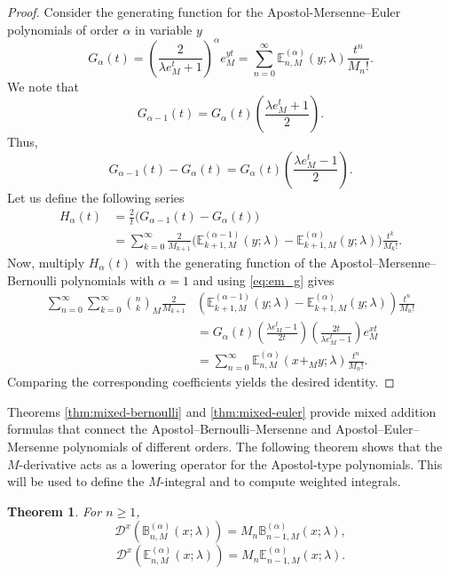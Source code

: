\documentclass[12pt, a4paper]{article}
\newtheorem{theorem}{Theorem}[section]
\theoremstyle{definition}
\numberwithin{equation}{section}
\newcommand{\B}{\mathbb{B}}
\newcommand{\E}{\mathbb{E}}
\begin{document}
\begin{proof}
Consider the generating function for the Apostol-Mersenne–Euler polynomials of order $\alpha$ in variable $y$
\[
G_\alpha(t) = \left(\frac{2}{\lambda e_M^t+1}\right)^\alpha e_M^{yt}
= \sum_{n=0}^\infty \E_{n,M}^{(\alpha)}(y;\lambda) \frac{t^n}{M_n!}. 
\]
We note that
\[
G_{\alpha-1}(t) = G_{\alpha}(t)\left(\frac{\lambda e_M^{t}+1}{2}\right).
\]
Thus,
\begin{equation}\label{eq:em_g}
G_{\alpha-1}(t)-G_{\alpha}(t) = G_{\alpha}(t)\left(\frac{\lambda e_M^{t}-1}{2}\right).
\end{equation}
Let us define the following series
\begin{align*}
H_{\alpha}(t) &= \frac{2}{t}\bigl( G_{\alpha-1}(t) - G_\alpha(t) \bigr)\\
&= \sum_{k=0}^\infty \frac{2}{M_{k+1}}\bigl( \E_{k+1,M}^{(\alpha-1)}(y;\lambda) - \E_{k+1,M}^{(\alpha)}(y;\lambda) \bigr) \frac{t^k}{M_k!}.
\end{align*}
Now, multiply $H_{\alpha}(t)$ with the generating function of the Apostol–Mersenne–Bernoulli polynomials with $\alpha = 1$ and using \eqref{eq:em_g} gives
\begin{align*}
\sum_{n=0}^{\infty}\sum_{k=0}^{\infty}\binom{n}{k}_M \frac{2}{M_{k+1}}&\left(\E_{k+1,M}^{(\alpha-1)}(y;\lambda) - \E_{k+1,M}^{(\alpha)}(y;\lambda)\right) \frac{t^n}{M_n!} \\
&= G_{\alpha}(t)\left(\frac{\lambda e_M^{t}-1}{2t}\right)\left(\frac{2t}{\lambda e_M^{t}-1}\right)e_M^{xt} \\
&= \sum_{n=0}^{\infty} \E_{n,M}^{(\alpha)}(x+_M y;\lambda) \frac{t^n}{M_n!}.
\end{align*}
Comparing the corresponding coefficients yields the desired identity.
\end{proof}
Theorems \ref{thm:mixed-bernoulli} and \ref{thm:mixed-euler} provide mixed addition formulas that connect the Apostol–Bernoulli–Mersenne and Apostol–Euler–Mersenne polynomials of different orders.
The following theorem shows that the $M$-derivative acts as a lowering operator for the Apostol-type polynomials. This will be used to define the $M$-integral and to compute weighted integrals.

\begin{theorem}\label{thm:m-derivative}
For $n\ge 1$,
\begin{equation}\label{eq:apostol-bm-derivative}
\mathcal{D}^x\left(\B_{n,M}^{(\alpha)}(x;\lambda)\right) = M_n \B_{n-1,M}^{(\alpha)}(x;\lambda),
\end{equation}
\begin{equation}\label{eq:apostol-em-derivative}
\mathcal{D}^x\left(\E_{n,M}^{(\alpha)}(x;\lambda)\right) = M_n \E_{n-1,M}^{(\alpha)}(x;\lambda).
\end{equation}
\end{theorem}
\end{document}
